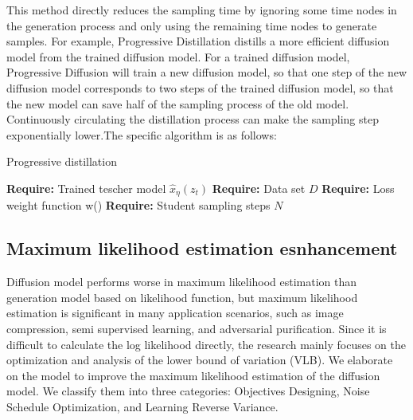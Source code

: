 \documentclass[conference]{IEEEtran}
\begin{document}
This method directly reduces the sampling time by ignoring some time nodes in the generation process and only using the remaining time nodes to generate samples. For example, Progressive Distillation distills a more efficient diffusion model from the trained diffusion model. For a trained diffusion model, Progressive Diffusion will train a new diffusion model, so that one step of the new diffusion model corresponds to two steps of the trained diffusion model, so that the new model can save half of the sampling process of the old model. Continuously circulating the distillation process can make the sampling step exponentially lower.The specific algorithm is as follows:
\begin{algorithm}[!h]{ %
	\caption{Progressive distillation}%
 \textbf{Require:} Trained tescher model $\hat{x}_\eta(z_t)$\;
 \textbf{Require:} Data set $D$\;
 \textbf{Require:} Loss weight function w()\;
 \textbf{Require:} Student sampling steps $N$\;
\LinesNumbered %
}
\end{algorithm}

\subsection{Maximum likelihood estimation esnhancement}

Diffusion model performs worse in maximum likelihood estimation than generation model based on likelihood function, but maximum likelihood estimation is significant in many application scenarios, such as image compression, semi supervised learning, and adversarial purification. Since it is difficult to calculate the log likelihood directly, the research mainly focuses on the optimization and analysis of the lower bound of variation (VLB). We elaborate on the model to improve the maximum likelihood estimation of the diffusion model. We classify them into three categories: Objectives Designing, Noise Schedule Optimization, and Learning Reverse Variance.
\end{document}
